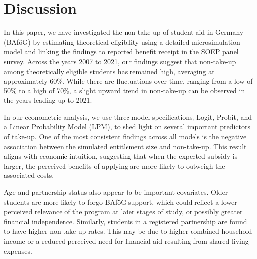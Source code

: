 \section{Discussion}

In this paper, we have investigated the non-take-up of student aid in Germany (BAföG) by estimating theoretical eligibility using a detailed microsimulation model and linking the findings to reported benefit receipt in the SOEP panel survey. Across the years 2007 to 2021, our findings suggest that non-take-up among theoretically eligible students has remained high, averaging at approximately 60\%. While there are fluctuations over time, ranging from a low of 50\% to a high of 70\%, a slight upward trend in non-take-up can be observed in the years leading up to 2021.


In our econometric analysis, we use three model specifications, Logit, Probit, and a Linear Probability Model (LPM), to shed light on several important predictors of take-up. One of the most consistent findings across all models is the negative association between the simulated entitlement size and non-take-up. This result aligns with economic intuition, suggesting that when the expected subsidy is larger, the perceived benefits of applying are more likely to outweigh the associated costs.

Age and partnership status also appear to be important covariates. 
Older students are more likely to forgo BAföG support, which could reflect a lower perceived relevance of the program at later stages of study, or possibly greater financial independence. 
Similarly, students in a registered partnership are found to have higher non-take-up rates. 
This may be due to higher combined household income or a reduced perceived need for financial aid resulting from shared living expenses.


